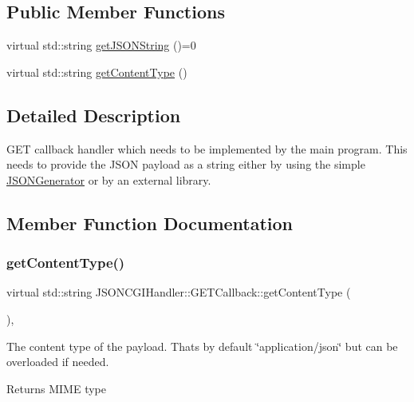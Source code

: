 \subsection*{Public Member Functions}
\begin{DoxyCompactItemize}
\item 
virtual std\+::string \hyperlink{classJSONCGIHandler_1_1GETCallback_a2367bf5a5912e9e5599ee464e0846255}{get\+J\+S\+O\+N\+String} ()=0
\item 
virtual std\+::string \hyperlink{classJSONCGIHandler_1_1GETCallback_a4e1fee495ddeb4e24eaa5b8e767ea838}{get\+Content\+Type} ()
\end{DoxyCompactItemize}


\subsection{Detailed Description}
G\+ET callback handler which needs to be implemented by the main program. This needs to provide the J\+S\+ON payload as a string either by using the simple \hyperlink{classJSONCGIHandler_1_1JSONGenerator}{J\+S\+O\+N\+Generator} or by an external library. 

\subsection{Member Function Documentation}
\mbox{\label{classJSONCGIHandler_1_1GETCallback_a4e1fee495ddeb4e24eaa5b8e767ea838}} 
\subsubsection{\texorpdfstring{get\+Content\+Type()}{getContentType()}}
{\footnotesize\ttfamily virtual std\+::string J\+S\+O\+N\+C\+G\+I\+Handler\+::\+G\+E\+T\+Callback\+::get\+Content\+Type (\begin{DoxyParamCaption}{ }\end{DoxyParamCaption})\hspace{0.3cm}{\ttfamily [inline]}, {\ttfamily [virtual]}}

The content type of the payload. That\textquotesingle{}s by default \char`\"{}application/json\char`\"{} but can be overloaded if needed. \begin{DoxyReturn}{Returns}
M\+I\+ME type 
\end{DoxyReturn}
\mbox{\label{classJSONCGIHandler_1_1GETCallback_a2367bf5a5912e9e5599ee464e0846255}} 
